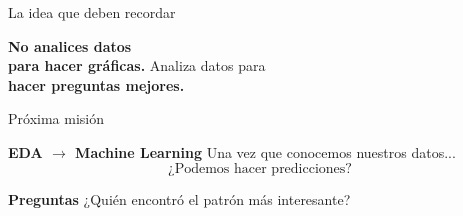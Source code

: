 \documentclass[aspectratio=169,11pt]{beamer}
\begin{document}
\begin{frame}{La idea que deben recordar}
\begin{center}
\Huge
\textbf{No analices datos\\
para hacer gráficas.}
\vspace{0.5cm}
\Large
Analiza datos para\\
\textbf{hacer preguntas mejores.}
\end{center}
\end{frame}
\begin{frame}{Próxima misión}
\begin{center}
\Huge
\textbf{EDA $\rightarrow$ Machine Learning}
\vspace{0.5cm}
\Large
Una vez que conocemos nuestros datos...
\vspace{0.3cm}
\[
\text{¿Podemos hacer predicciones?}
\]
\end{center}
\end{frame}
\begin{frame}
\begin{center}
\Huge
\textbf{Preguntas}
\vspace{1cm}
\Large
¿Quién encontró el patrón más interesante?
\end{center}
\end{frame}
\end{document}
